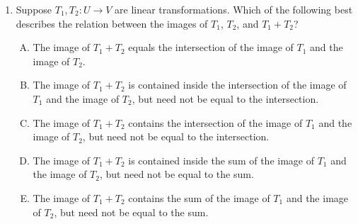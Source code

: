 \documentclass[10pt]{amsart}
\begin{document}
\begin{enumerate}
  \begin{itemize}
  \item Suppose $\vec{u}$ is in the intersection of the kernel of
    $T_1$ and the kernel of $T_2$. Then, $\vec{u}$ is in the kernel of
    $T_1 + T_2$: This is easy to see: $(T_1 + T_2)(\vec{u}) =
    T_1(\vec{u}) + T_2(\vec{u}) = 0 + 0 = 0$.
  \item It is possible to have a situation where the kernel of $T_1 +
    T_2$ does not contain the sum of the kernels of $T_1$ and
    $T_2$. For instance, consider the case that $T_1$ has matrix $[0]$
    and $T_2$ has matrix $[1]$.
  \item It is possible to have a situation where the kernel of $T_1 +
    T_2$ is not even contained inside the sum of the kernels of $T_1$
    and $T_2$, let alone the intersection: Consider $T_1$ to be the
    linear transformation with matrix $[1]$ and $T_2$ to be the linear
    transformation with matrix $[-1]$. Both have zero kernels, so the
    sum of the kernels is also zero. But the sum $T_1 + T_2$ is a
    linear transformation with matrix $[0]$, so its kernel is all of $\R$.
  \end{itemize}

  {\em Performance review}: 11 out of 27 got this. 6 chose (A), 4 each
  chose (B) and (D), 1 chose (E), 1 left the question blank.

  {\em Historical note (last time)}: $3$ out of $26$ got this. $10$ chose (B),
  $6$ each chose (A) and (D), $1$ chose (E).

\item Suppose $T_1, T_2: U \to V$ are linear transformations. Which of
  the following best describes the relation between the images of
  $T_1$, $T_2$, and $T_1 + T_2$?

  \begin{enumerate}[(A)]
  \item The image of $T_1 + T_2$ equals the intersection of the
    image of $T_1$ and the image of $T_2$.
  \item The image of $T_1 + T_2$ is contained inside the intersection
    of the image of $T_1$ and the image of $T_2$, but need not be
    equal to the intersection.
  \item The image of $T_1 + T_2$ contains the intersection of the
    image of $T_1$ and the image of $T_2$, but need not be equal to
    the intersection.
  \item The image of $T_1 + T_2$ is contained inside the sum of the
    image of $T_1$ and the image of $T_2$, but need not be equal to
    the sum.
  \item The image of $T_1 + T_2$ contains the sum of the image of
    $T_1$ and the image of $T_2$, but need not be equal to the sum.
  \end{enumerate}


\end{enumerate}
\end{document}
